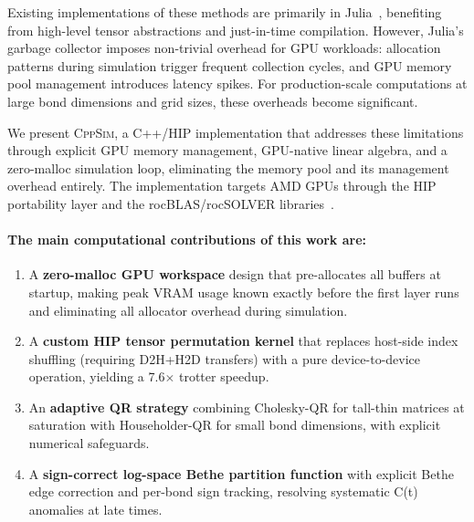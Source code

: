 \documentclass[11pt]{article}
\begin{document}
Existing implementations of these methods are primarily in Julia~\citep{rudolph2025simulating},
benefiting from high-level tensor abstractions and just-in-time compilation. However,
Julia's garbage collector imposes non-trivial overhead for GPU workloads:
allocation patterns during simulation trigger frequent collection cycles, and GPU
memory pool management introduces latency spikes. For production-scale computations
at large bond dimensions and grid sizes, these overheads become significant.

We present \textsc{CppSim}, a C++/HIP implementation that addresses these limitations
through explicit GPU memory management, GPU-native linear algebra, and a zero-malloc
simulation loop, eliminating the memory pool and its management overhead entirely.
The implementation targets AMD GPUs through the HIP portability
layer and the rocBLAS/rocSOLVER libraries~\citep{rocblas,rocsolver}.

\paragraph{The main computational contributions of this work are:}
\begin{enumerate}
  \item A \textbf{zero-malloc GPU workspace} design that pre-allocates
    all buffers at startup, making peak VRAM usage known exactly
    before the first layer runs and eliminating all allocator overhead
    during simulation.
  \item A \textbf{custom HIP tensor permutation kernel} that replaces
    host-side index shuffling (requiring D2H+H2D transfers) with a
    pure device-to-device operation, yielding a 7.6$\times$ trotter
    speedup.
  \item An \textbf{adaptive QR strategy} combining Cholesky-QR for
    tall-thin matrices at saturation with Householder-QR for small
    bond dimensions, with explicit numerical safeguards.
  \item A \textbf{sign-correct log-space Bethe partition function}
    with explicit Bethe edge correction and per-bond sign tracking,
    resolving systematic C(t) anomalies at late times.
\end{enumerate}
\end{document}
